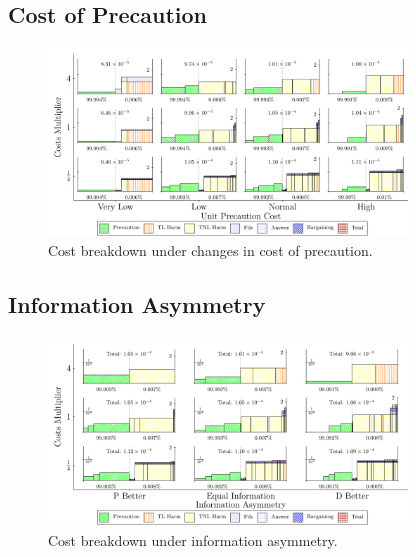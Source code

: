 \documentclass{article}
\begin{document}
\subsection{Cost of Precaution}
\begin{figure}[ht]
  \centering
  \includegraphics[width=0.85\textwidth]{../Figures/Cost Breakdown Unit Precaution Cost (All Rows).pdf}
  \caption{Cost breakdown under changes in cost of precaution.}
  \label{fig:cost_precaution}
\end{figure}

\FloatBarrier
\subsection{Information Asymmetry}
\begin{figure}[ht]
  \centering
  \includegraphics[width=0.85\textwidth]{../Figures/Cost Breakdown Information Asymmetry (All Rows).pdf}
  \caption{Cost breakdown under information asymmetry.}
  \label{fig:info_asymmetry}
\end{figure}

\FloatBarrier
\end{document}
